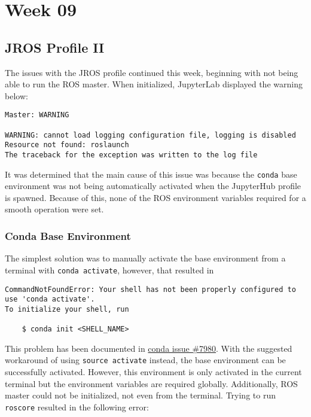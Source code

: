 \chapter{Week 09}

\section{JROS Profile II}

    The issues with the JROS profile continued this week, beginning with not being able to run the ROS master. When initialized, JupyterLab displayed the warning below: 


    \begin{lstlisting}[language=warning]
Master: WARNING

WARNING: cannot load logging configuration file, logging is disabled
Resource not found: roslaunch
The traceback for the exception was written to the log file     
    \end{lstlisting}

    \noindent It was determined that the main cause of this issue was because the \texttt{conda} base environment was not being automatically activated when the JupyterHub profile is spawned. Because of this, none of the ROS environment variables required for a smooth operation were set.

    \subsection{Conda Base Environment}

    The simplest solution was to manually activate the base environment from a terminal with \texttt{conda activate}, however, that resulted in

    \begin{lstlisting}[language=error]
CommandNotFoundError: Your shell has not been properly configured to use 'conda activate'.
To initialize your shell, run

    $ conda init <SHELL_NAME>
    \end{lstlisting}




    \noindent This problem has been documented in \href{https://github.com/conda/conda/issues/7980}{conda issue \#7980}. With the suggested workaround of using \texttt{source activate} instead, the base environment can be successfully activated. However, this environment is only activated in the current terminal but the environment variables are required globally. Additionally, ROS master could not be initialized, not even from the terminal. Trying to run \texttt{roscore} resulted in the following error:

